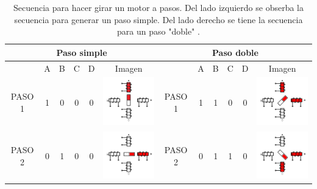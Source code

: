 \begin{table} [h!]
	\centering
	\caption[Secuencia para hacer girar un motor a pasos. \cite{BasicStepper}]{Secuencia para hacer girar un motor a pasos. Del lado izquierdo se obserba la secuencia para generar un paso simple. Del lado derecho se tiene la secuencia para un paso "doble" \cite{BasicStepper}.}
	\vspace{10mm}
	\label{tabla:pasoDobleySimple}
		\begin{tabular}{|c|c|c|c|c|c|c|c|c|c|c|c|}
			\hline 
			\multicolumn{6}{|c|}{Paso simple} & \multicolumn{6}{|c|}{Paso doble} %
			\\ 
			\hline 
			 & A  &  B & C  & D & Imagen & & A & B & C & D & Imagen \\ 
			\hline 
			PASO 1  & 1 & 0 & 0 & 0 & \includegraphics[width=33mm]{Imagenes/2/paso1} & PASO 1 & 1 & 1 & 0 & 0 & \includegraphics[width=33mm]{Imagenes/2/paso1_5}\\ 
			\hline 
			PASO 2 & 0 & 1 & 0 & 0 & \includegraphics[width=33mm]{Imagenes/2/paso2} & PASO 2 & 0 & 1 & 1 & 0 &  \includegraphics[width=33mm]{Imagenes/2/paso2_5} \\ 
			\hline

\end{tabular}
\end{table}
